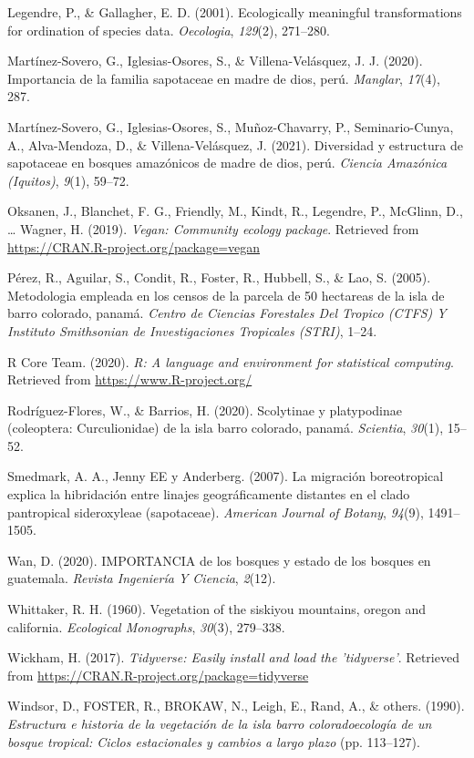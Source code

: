 \documentclass[11pt,]{article}
\begin{document}
\hypertarget{ref-legendre2001ecologically}{}
Legendre, P., \& Gallagher, E. D. (2001). Ecologically meaningful
transformations for ordination of species data. \emph{Oecologia},
\emph{129}(2), 271--280.

\hypertarget{ref-martinez2020importancia}{}
Martínez-Sovero, G., Iglesias-Osores, S., \& Villena-Velásquez, J. J.
(2020). Importancia de la familia sapotaceae en madre de dios, perú.
\emph{Manglar}, \emph{17}(4), 287.

\hypertarget{ref-martinez2021diversidad}{}
Martínez-Sovero, G., Iglesias-Osores, S., Muñoz-Chavarry, P.,
Seminario-Cunya, A., Alva-Mendoza, D., \& Villena-Velásquez, J. (2021).
Diversidad y estructura de sapotaceae en bosques amazónicos de madre de
dios, perú. \emph{Ciencia Amazónica (Iquitos)}, \emph{9}(1), 59--72.

\hypertarget{ref-vegan}{}
Oksanen, J., Blanchet, F. G., Friendly, M., Kindt, R., Legendre, P.,
McGlinn, D., \ldots{} Wagner, H. (2019). \emph{Vegan: Community ecology
package}. Retrieved from \url{https://CRAN.R-project.org/package=vegan}

\hypertarget{ref-perez2005metodologia}{}
Pérez, R., Aguilar, S., Condit, R., Foster, R., Hubbell, S., \& Lao, S.
(2005). Metodologia empleada en los censos de la parcela de 50 hectareas
de la isla de barro colorado, panamá. \emph{Centro de Ciencias
Forestales Del Tropico (CTFS) Y Instituto Smithsonian de Investigaciones
Tropicales (STRI)}, 1--24.

\hypertarget{ref-Restudio}{}
R Core Team. (2020). \emph{R: A language and environment for statistical
computing}. Retrieved from \url{https://www.R-project.org/}

\hypertarget{ref-rodriguez2020scolytinae}{}
Rodríguez-Flores, W., \& Barrios, H. (2020). Scolytinae y platypodinae
(coleoptera: Curculionidae) de la isla barro colorado, panamá.
\emph{Scientia}, \emph{30}(1), 15--52.

\hypertarget{ref-smedmark2007boreotropical}{}
Smedmark, A. A., Jenny EE y Anderberg. (2007). La migración
boreotropical explica la hibridación entre linajes geográficamente
distantes en el clado pantropical sideroxyleae (sapotaceae).
\emph{American Journal of Botany}, \emph{94}(9), 1491--1505.

\hypertarget{ref-wan2020importancia}{}
Wan, D. (2020). IMPORTANCIA de los bosques y estado de los bosques en
guatemala. \emph{Revista Ingeniería Y Ciencia}, \emph{2}(12).

\hypertarget{ref-whittaker1960vegetation}{}
Whittaker, R. H. (1960). Vegetation of the siskiyou mountains, oregon
and california. \emph{Ecological Monographs}, \emph{30}(3), 279--338.

\hypertarget{ref-tidyverse}{}
Wickham, H. (2017). \emph{Tidyverse: Easily install and load the
'tidyverse'}. Retrieved from
\url{https://CRAN.R-project.org/package=tidyverse}

\hypertarget{ref-windsorestructura}{}
Windsor, D., FOSTER, R., BROKAW, N., Leigh, E., Rand, A., \& others.
(1990). \emph{Estructura e historia de la vegetación de la isla barro
coloradoecología de un bosque tropical: Ciclos estacionales y cambios a
largo plazo} (pp. 113--127).




\newpage
\singlespacing 
\end{document}
